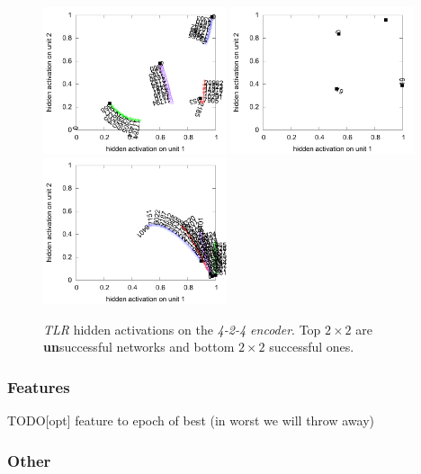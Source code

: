 \begin{figure}[H]
  \includegraphics[width=0.48\textwidth]{img/hid-tlr-good-tiny.pdf}  
  \includegraphics[width=0.48\textwidth]{img/hid-tlr-good-init.pdf}  
  \includegraphics[width=0.48\textwidth]{img/hid-tlr-good-weird.pdf}  
  \caption{\emph{TLR} hidden activations on the \emph{4-2-4 encoder}. Top $2\times2$ are {\bf un}successful networks and bottom $2\times2$ successful ones.}
  \label{fig:results-hidden-activations-tlr}
\end{figure}

\subsubsection{Features}
\label{sec:results-auto4-bal-matrix-sim}

TODO[opt] feature to epoch of best (in worst we will throw away) 

\subsubsection{Other} 

